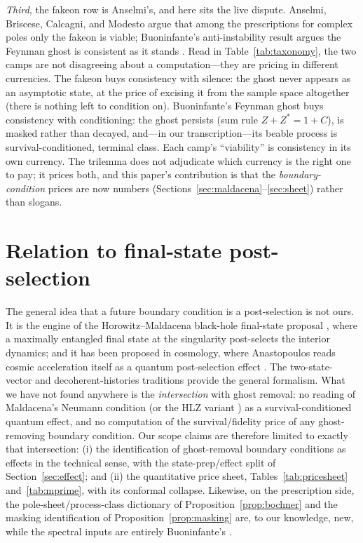 \documentclass[11pt]{article}
\theoremstyle{definition}
\theoremstyle{remark}
\begin{document}
\emph{Third}, the fakeon row is Anselmi's, and here sits the live
dispute. Anselmi, Briscese, Calcagni, and Modesto
\cite{Anselmi2025} argue that among the prescriptions for complex
poles only the fakeon is viable; Buoninfante's anti-instability
result argues the Feynman ghost is consistent as it stands
\cite{BuoninfanteP2,BuoninfanteP3}. Read in
Table~\ref{tab:taxonomy}, the two camps are not disagreeing about a
computation---they are pricing in different currencies. The fakeon
buys consistency with silence: the ghost never appears as an
asymptotic state, at the price of excising it from the sample space
altogether (there is nothing left to condition on). Buoninfante's
Feynman ghost buys consistency with conditioning: the ghost persists
(sum rule $Z+Z^{*}=1+C$), is masked rather than decayed, and---in our
transcription---its beable process is survival-conditioned, terminal
class. Each camp's ``viability'' is consistency in its own currency.
The trilemma does not adjudicate which currency is the right one to
pay; it prices both, and this paper's contribution is that the
\emph{boundary-condition} prices are now numbers
(Sections~\ref{sec:maldacena}--\ref{sec:sheet}) rather
than slogans.

\section{Relation to final-state post-selection}
\label{sec:priorart}

The general idea that a future boundary condition is a
post-selection is not ours. It is the engine of the
Horowitz--Maldacena black-hole final-state proposal
\cite{HorowitzMaldacena}, where a maximally entangled final state at
the singularity post-selects the interior dynamics; and it has been
proposed in cosmology, where Anastopoulos reads cosmic acceleration
itself as a quantum post-selection effect \cite{Anastopoulos2024}.
The two-state-vector and decoherent-histories traditions provide the
general formalism. What we have not found anywhere is the
\emph{intersection} with ghost removal: no reading of Maldacena's
Neumann condition \cite{Maldacena2011} (or the HLZ variant
\cite{HLZ}) as a survival-conditioned quantum effect, and no
computation of the survival/fidelity price of any ghost-removing
boundary condition. Our scope claims are therefore limited to
exactly that intersection: (i) the identification of ghost-removal
boundary conditions as effects in the technical sense, with the
state-prep/effect split of Section~\ref{sec:effect}; and (ii) the
quantitative price sheet, Tables~\ref{tab:pricesheet}
and~\ref{tab:mprime}, with its conformal collapse. Likewise, on the
prescription side, the pole-sheet/process-class dictionary of
Proposition~\ref{prop:bochner} and the masking identification of
Proposition~\ref{prop:masking} are, to our knowledge, new, while the
spectral inputs are entirely Buoninfante's
\cite{BuoninfanteP1,BuoninfanteP2,BuoninfanteP3}.
\end{document}
